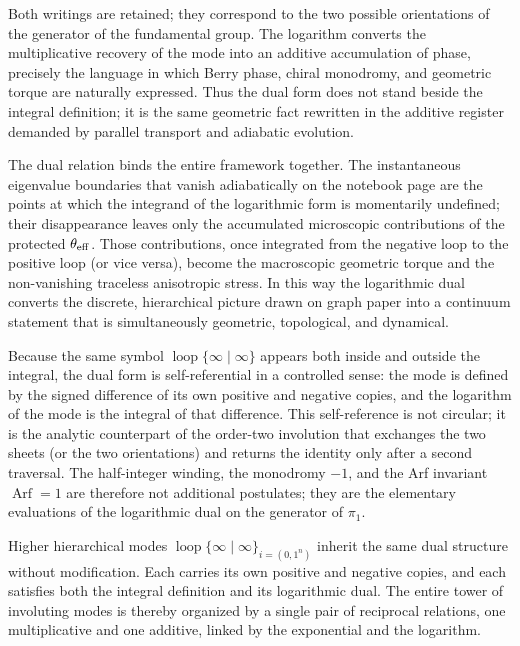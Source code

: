 Both writings are retained; they correspond to the two possible orientations of the generator of the fundamental group. The logarithm converts the multiplicative recovery of the mode into an additive accumulation of phase, precisely the language in which Berry phase, chiral monodromy, and geometric torque are naturally expressed. Thus the dual form does not stand beside the integral definition; it is the same geometric fact rewritten in the additive register demanded by parallel transport and adiabatic evolution.

The dual relation binds the entire framework together. The instantaneous eigenvalue boundaries that vanish adiabatically on the notebook page are the points at which the integrand of the logarithmic form is momentarily undefined; their disappearance leaves only the accumulated microscopic contributions of the protected \(\theta_{\rm eff}\). Those contributions, once integrated from the negative loop to the positive loop (or vice versa), become the macroscopic geometric torque and the non-vanishing traceless anisotropic stress. In this way the logarithmic dual converts the discrete, hierarchical picture drawn on graph paper into a continuum statement that is simultaneously geometric, topological, and dynamical.

Because the same symbol \(\operatorname{loop}\{\infty\mid\infty\}\) appears both inside and outside the integral, the dual form is self-referential in a controlled sense: the mode is defined by the signed difference of its own positive and negative copies, and the logarithm of the mode is the integral of that difference. This self-reference is not circular; it is the analytic counterpart of the order-two involution that exchanges the two sheets (or the two orientations) and returns the identity only after a second traversal. The half-integer winding, the monodromy \(-1\), and the Arf invariant \(\operatorname{Arf}=1\) are therefore not additional postulates; they are the elementary evaluations of the logarithmic dual on the generator of \(\pi_1\).

Higher hierarchical modes \(\operatorname{loop}\{\infty\mid\infty\}_{i=(0,1^n)}\) inherit the same dual structure without modification. Each carries its own positive and negative copies, and each satisfies both the integral definition and its logarithmic dual. The entire tower of involuting modes is thereby organized by a single pair of reciprocal relations, one multiplicative and one additive, linked by the exponential and the logarithm.

